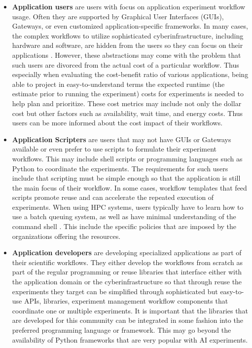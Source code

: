 \documentclass[sigconf]{acmart}
\begin{document}
\begin{itemize}
    \item {\bf Application users} are users with focus on application experiment workflow usage. Often they are supported by Graphical User Interfaces (GUIs), Gateways, or even customized application-specific frameworks. In many cases, the complex workflows to utilize sophisticated cyberinfrastructure, including hardware and software, are hidden from the users so they can focus on their applications \citep{lee2021}. However, these abstractions may come with the problem that such users are divorced from the actual cost of a particular workflow. Thus especially when evaluating the cost-benefit ratio of various applications, being able to project in easy-to-understand terms the expected runtime (the estimate prior to running the experiment) costs for experiments is needed to help plan and prioritize. These cost metrics may include not only the dollar cost but other factors such as availability, wait time, and energy costs. Thus users can be more informed about the cost impact of their workflows.
    \item {\bf Application Scripters} are users that may not have GUIs or Gateways available or even prefer to use scripts to formulate their experiment workflows. This may include shell scripts or programming languages such as Python to coordinate the experiments. The requirements for such users include that scripting must be simple enough so that the application is still the main focus of their workflow. In some cases, workflow templates that feed scripts promote reuse and can accelerate the repeated execution of experiments. When using HPC systems, users typically have to learn how to use a batch queuing system, as well as have minimal understanding of the command shell \citep{wilson2021}. This include the specific policies that are imposed by the organizations offering the resources. 
    \item {\bf Application developers} are developing specialized applications as part of their scientific workflows. They either develop the workflows from scratch as part of the regular programming or reuse libraries that interface either with the application domain or the cyberinfrastructure so that through reuse the experiments they target can be simplified through sophisticated but easy-to-use APIs, libraries, experiment management workflow components that coordinate one or multiple experiments. It is important that the libraries that are developed for this community can be integrated in some fashion into the preferred programming language or framework. This may go beyond the availability of Python frameworks that are very popular with AI experiments. 

\end{itemize}
\end{document}
